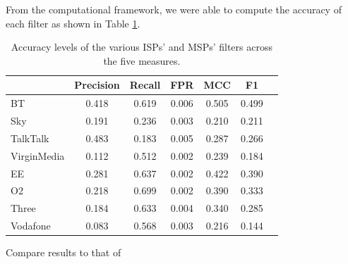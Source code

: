 \documentclass{bmcart}
\begin{document}
From the computational framework, we were able to compute the accuracy of each filter as shown in Table \ref{tab:accuracy}.

\begin{table}[h!]
\caption{Accuracy levels of the various ISPs' and MSPs' filters across the five measures.}
  \begin{tabular}{ l c c c c c c}
    \hline
     & Precision & Recall & FPR & MCC & F1 \\
    \hline
	BT & 0.418 & 0.619 & 0.006 & 0.505 & 0.499 \\
    Sky & 0.191 & 0.236 & 0.003 & 0.210 & 0.211 \\
    TalkTalk & 0.483 & 0.183 & 0.005 & 0.287 & 0.266 \\
	VirginMedia & 0.112 & 0.512 & 0.002 & 0.239 & 0.184 \\
	\hline    
	EE & 0.281 & 0.637 & 0.002 & 0.422 & 0.390 \\
	O2 & 0.218 & 0.699 & 0.002 & 0.390 & 0.333 \\
	Three & 0.184 & 0.633 & 0.004 & 0.340 & 0.285 \\
	Vodafone & 0.083 & 0.568 & 0.003 & 0.216 & 0.144 \\
    \hline
  \end{tabular}
  \label{tab:accuracy}
\end{table}




Compare results to that of \cite{stark2007effectiveness}


\end{document}
